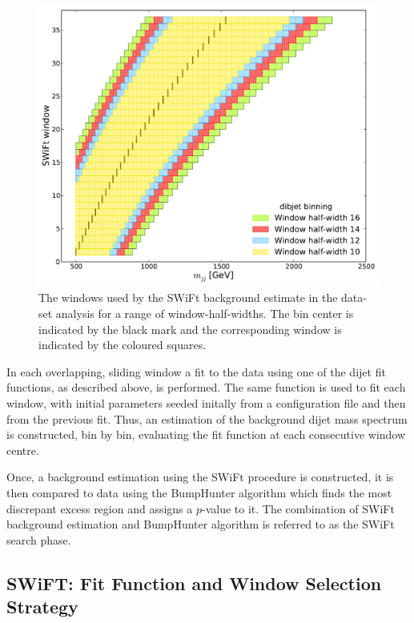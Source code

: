 \begin{figure}[!htb]
\centering
\includegraphics[scale=0.5, angle=0]{figs/Dibjet/LowMass/evt-swiftBins_min500_fl0_fh0_tr0.pdf}
\vspace{10pt}
\caption{\label{fig:bkg-lm_swiftBins}
  The windows used by the SWiFt background estimate in the \lm{} data-set analysis for a range of window-half-widths.
  The bin center is indicated by the black mark and the corresponding window is indicated by the coloured squares.}
\end{figure}

In each overlapping, sliding window a fit to the data using one of the dijet fit functions, as described above, is performed.
The same function is used to fit each window,
with initial parameters seeded initally from a configuration file and then from the previous fit.
Thus, an estimation of the background dijet mass spectrum is constructed, bin by bin,
evaluating the fit function at each consecutive window centre.

Once, a background estimation using the SWiFt procedure is constructed,
it is then compared to data using the {\sc BumpHunter} algorithm which finds the most discrepant excess region and assigns a $p$-value to it.
The combination of SWiFt background estimation and {\sc BumpHunter} algorithm is referred to as the SWiFt search phase.

\subsection{SWiFT: Fit Function and Window Selection Strategy}
\label{sec:windowSel}

